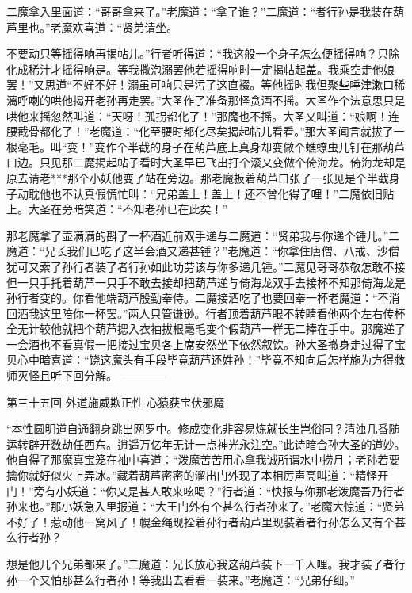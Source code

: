\documentclass[12pt,UTF8]{ctexbook}
\begin{document}
二魔拿入里面道：“哥哥拿来了。”老魔道：“拿了谁？”二魔道：“者行孙是我装在葫芦里也。”老魔欢喜道：“贤弟请坐。

不要动只等摇得响再揭帖儿。”行者听得道：“我这般一个身子怎么便摇得响？只除化成稀汁才摇得响是。等我撒泡溺罢他若摇得响时一定揭帖起盖。我乘空走他娘罢！”又思道“不好不好！溺虽可响只是污了这直裰。等他摇时我但聚些唾津漱口稀漓呼喇的哄他揭开老孙再走罢。”大圣作了准备那怪贪酒不摇。大圣作个法意思只是哄他来摇忽然叫道：“天呀！孤拐都化了！”那魔也不摇。大圣又叫道：“娘啊！连腰截骨都化了！”老魔道：“化至腰时都化尽矣揭起帖儿看看。”那大圣闻言就拔了一根毫毛。叫“变！”变作个半截的身子在葫芦底上真身却变做个蟭蟟虫儿钉在那葫芦口边。只见那二魔揭起帖子看时大圣早已飞出打个滚又变做个倚海龙。倚海龙却是原去请老***那个小妖他变了站在旁边。那老魔扳着葫芦口张了一张见是个半截身子动耽他也不认真假慌忙叫：“兄弟盖上！盖上！还不曾化得了哩！”二魔依旧贴上。大圣在旁暗笑道：“不知老孙已在此矣！”

那老魔拿了壶满满的斟了一杯酒近前双手递与二魔道：“贤弟我与你递个锺儿。”二魔道：“兄长我们已吃了这半会酒又递甚锺？”老魔道：“你拿住唐僧、八戒、沙僧犹可又索了孙行者装了者行孙如此功劳该与你多递几锺。”二魔见哥哥恭敬怎敢不接但一只手托着葫芦一只手不敢去接却把葫芦递与倚海龙双手去接杯不知那倚海龙是孙行者变的。你看他端葫芦殷勤奉侍。二魔接酒吃了也要回奉一杯老魔道：“不消回酒我这里陪你一杯罢。”两人只管谦逊。行者顶着葫芦眼不转睛看他两个左右传杯全无计较他就把个葫芦揌入衣袖拔根毫毛变个假葫芦一样无二捧在手中。那魔递了一会酒也不看真假一把接过宝贝各上席安然坐下依然叙饮。孙大圣撤身走过得了宝贝心中暗喜道：“饶这魔头有手段毕竟葫芦还姓孙！”毕竟不知向后怎样施为方得救师灭怪且听下回分解。
------------

第三十五回 外道施威欺正性 心猿获宝伏邪魔

“本性圆明道自通翻身跳出网罗中。修成变化非容易炼就长生岂俗同？清浊几番随运转辟开数劫任西东。逍遥万亿年无计一点神光永注空。”此诗暗合孙大圣的道妙。他自得了那魔真宝笼在袖中喜道：“泼魔苦苦用心拿我诚所谓水中捞月；老孙若要擒你就好似火上弄冰。”藏着葫芦密密的溜出门外现了本相厉声高叫道：“精怪开门！”旁有小妖道：“你又是甚人敢来吆喝？”行者道：“快报与你那老泼魔吾乃行者孙来也。”那小妖急入里报道：“大王门外有个甚么行者孙来了。”老魔大惊道：“贤弟不好了！惹动他一窝风了！幌金绳现拴着孙行者葫芦里现装着者行孙怎么又有个甚么行者孙？

想是他几个兄弟都来了。”二魔道：兄长放心我这葫芦装下一千人哩。我才装了者行孙一个又怕那甚么行者孙！等我出去看看一装来。”老魔道：“兄弟仔细。”
\end{document}
